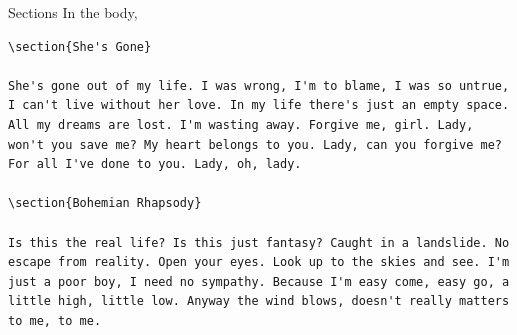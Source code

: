 \documentclass[12pt]{gshs_lecture}
\begin{document}
\begin{frame}[t,fragile]{Sections}\small
In the body,
\begin{block}{}
\begin{lstlisting}
\section{She's Gone}

She's gone out of my life. I was wrong, I'm to blame, I was so untrue, I can't live without her love. In my life there's just an empty space. All my dreams are lost. I'm wasting away. Forgive me, girl. Lady, won't you save me? My heart belongs to you. Lady, can you forgive me? For all I've done to you. Lady, oh, lady.

\section{Bohemian Rhapsody}

Is this the real life? Is this just fantasy? Caught in a landslide. No escape from reality. Open your eyes. Look up to the skies and see. I'm just a poor boy, I need no sympathy. Because I'm easy come, easy go, a little high, little low. Anyway the wind blows, doesn't really matters to me, to me.
\end{lstlisting}
\end{block}
\end{frame}
\end{document}
